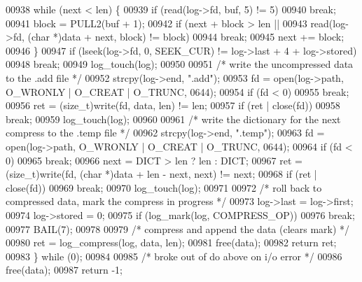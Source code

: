 \begin{DoxyCode}
{00938         \textcolor{keywordflow}{while} (next < len) \{
00939             \textcolor{keywordflow}{if} (read(log->fd, buf, 5) != 5)
00940                 \textcolor{keywordflow}{break};
00941             block = PULL2(buf + 1);
00942             \textcolor{keywordflow}{if} (next + block > len ||
00943                 read(log->fd, (\textcolor{keywordtype}{char} *)data + next, block) != block)
00944                 \textcolor{keywordflow}{break};
00945             next += block;
00946         \}
00947         \textcolor{keywordflow}{if} (lseek(log->fd, 0, SEEK\_CUR) != log->last + 4 + log->stored)
00948             \textcolor{keywordflow}{break};
00949         log\_touch(log);
00950 
00951         \textcolor{comment}{/* write the uncompressed data to the .add file */}
00952         strcpy(log->end, \textcolor{stringliteral}{".add"});
00953         fd = open(log->path, O\_WRONLY | O\_CREAT | O\_TRUNC, 0644);
00954         \textcolor{keywordflow}{if} (fd < 0)
00955             \textcolor{keywordflow}{break};
00956         ret = (size\_t)write(fd, data, len) != len;
00957         \textcolor{keywordflow}{if} (ret | close(fd))
00958             \textcolor{keywordflow}{break};
00959         log\_touch(log);
00960 
00961         \textcolor{comment}{/* write the dictionary for the next compress to the .temp file */}
00962         strcpy(log->end, \textcolor{stringliteral}{".temp"});
00963         fd = open(log->path, O\_WRONLY | O\_CREAT | O\_TRUNC, 0644);
00964         \textcolor{keywordflow}{if} (fd < 0)
00965             \textcolor{keywordflow}{break};
00966         next = DICT > len ? len : DICT;
00967         ret = (size\_t)write(fd, (\textcolor{keywordtype}{char} *)data + len - next, next) != next;
00968         \textcolor{keywordflow}{if} (ret | close(fd))
00969             \textcolor{keywordflow}{break};
00970         log\_touch(log);
00971 
00972         \textcolor{comment}{/* roll back to compressed data, mark the compress in progress */}
00973         log->last = log->first;
00974         log->stored = 0;
00975         \textcolor{keywordflow}{if} (log\_mark(log, COMPRESS\_OP))
00976             \textcolor{keywordflow}{break};
00977         BAIL(7);
00978 
00979         \textcolor{comment}{/* compress and append the data (clears mark) */}
00980         ret = log\_compress(log, data, len);
00981         free(data);
00982         \textcolor{keywordflow}{return} ret;
00983     \} \textcolor{keywordflow}{while} (0);
00984 
00985     \textcolor{comment}{/* broke out of do above on i/o error */}
00986     free(data);
00987     \textcolor{keywordflow}{return} -1;
}
\end{DoxyCode}

